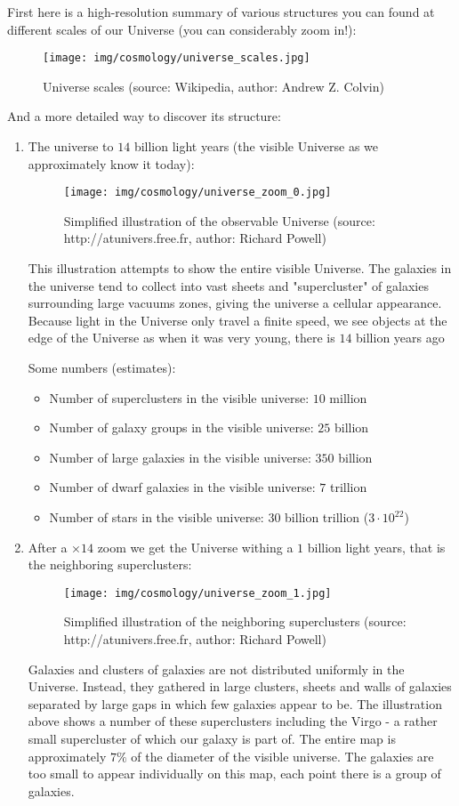 	First here is a high-resolution summary of various structures you can found at different scales of our Universe (you can considerably zoom in!):
	\begin{figure}[H]
		\centering
		\texttt{[image: img/cosmology/universe\_scales.jpg]}
		\caption{Universe scales (source: Wikipedia, author: Andrew Z. Colvin)}
	\end{figure}
	And a more detailed way to discover its structure:
	\begin{enumerate}
		\item The universe to $14$ billion light years (the visible Universe as we approximately know it today):
		\begin{figure}[H]
			\centering
			\texttt{[image: img/cosmology/universe\_zoom\_0.jpg]}
			\caption{Simplified illustration of the observable Universe (source: http://atunivers.free.fr, author: Richard Powell)}
		\end{figure}
		This illustration attempts to show the entire visible Universe. The galaxies in the universe tend to collect into vast sheets and "supercluster" of galaxies surrounding large vacuums zones, giving the universe a cellular appearance. Because light in the Universe only travel a finite speed, we see objects at the edge of the Universe as when it was very young, there is $14$ billion years ago

		Some numbers (estimates):
		\begin{itemize}
			\item Number of superclusters in the visible universe: $10$ million
			\item Number of galaxy groups in the visible universe: $25$ billion
			\item Number of large galaxies in the visible universe: $350$ billion
			\item Number of dwarf galaxies in the visible universe: $7$ trillion
			\item Number of stars in the visible universe: $30$ billion trillion  ($3\cdot 10^{22}$)
		\end{itemize}
		
		\item After a $\times 14$ zoom we get the Universe withing a $1$ billion light years, that is the neighboring superclusters:
		\begin{figure}[H]
			\centering
			\texttt{[image: img/cosmology/universe\_zoom\_1.jpg]}
			\caption{Simplified illustration of the neighboring superclusters (source: http://atunivers.free.fr, author: Richard Powell)}
		\end{figure}
		Galaxies and clusters of galaxies are not distributed uniformly in the Universe. Instead, they gathered in large clusters, sheets and walls of galaxies separated by large gaps in which few galaxies appear to be. The illustration above shows a number of these superclusters including the Virgo - a rather small supercluster of which our galaxy is part of. The entire map is approximately $7\%$ of the diameter of the visible universe. The galaxies are too small to appear individually on this map, each point there is a group of galaxies.
		

\end{enumerate}
